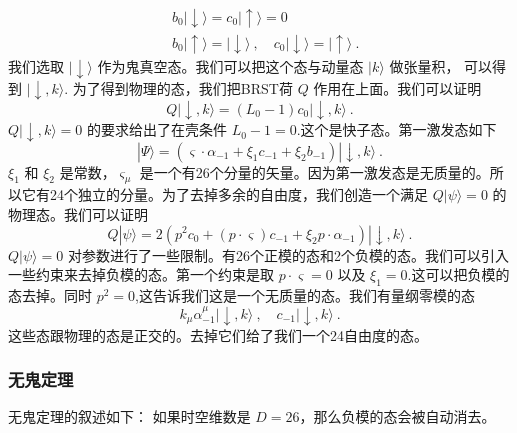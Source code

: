 \begin{equation}
\begin{aligned}
& b_0|\downarrow\rangle = c_0 |\uparrow\rangle = 0 \\
& b_0|\uparrow\rangle = |\downarrow\rangle~,\quad c_0|\downarrow\rangle = |\uparrow\rangle~.
\end{aligned} 
\end{equation}
我们选取 $|\downarrow\rangle$ 作为鬼真空态。我们可以把这个态与动量态 $|k\rangle$ 做张量积， 可以得到 $|\downarrow,k\rangle$. 为了得到物理的态，我们把BRST荷 $Q$ 作用在上面。我们可以证明
\begin{equation}
Q|\downarrow,k\rangle = (L_0-1)c_0|\downarrow,k\rangle~.
\end{equation}
$Q|\downarrow,k\rangle=0$ 的要求给出了在壳条件 $L_0-1=0$.这个是快子态。第一激发态如下
\begin{equation}
|\Psi\rangle = (\varsigma\cdot\alpha_{-1}+\xi_1c_{-1}+\xi_2b_{-1})|\downarrow,k\rangle~.
\end{equation}
$\xi_1$ 和 $\xi_2$ 是常数，$\varsigma_\mu$ 是一个有26个分量的矢量。因为第一激发态是无质量的。所以它有24个独立的分量。为了去掉多余的自由度，我们创造一个满足 $Q|\psi\rangle = 0$ 的物理态。我们可以证明
\begin{equation}
Q|\psi\rangle = 2 (p^2 c_0+(p\cdot \varsigma) c_{-1} + \xi_2 p\cdot \alpha_{-1} ) | \downarrow, k\rangle~.
\end{equation}
$Q|\psi\rangle = 0$ 对参数进行了一些限制。有26个正模的态和2个负模的态。我们可以引入一些约束来去掉负模的态。第一个约束是取 $p\cdot\varsigma = 0$ 以及 $\xi_1=0$.这可以把负模的态去掉。同时 $p^2=0$,这告诉我们这是一个无质量的态。我们有量纲零模的态
\begin{equation}
k_\mu\alpha^\mu_{-1}|\downarrow,k\rangle~,\quad c_{-1} |\downarrow,k\rangle~.
\end{equation}
这些态跟物理的态是正交的。去掉它们给了我们一个24自由度的态。

\subsubsection{无鬼定理}
无鬼定理的叙述如下：
如果时空维数是 $D=26$，那么负模的态会被自动消去。


